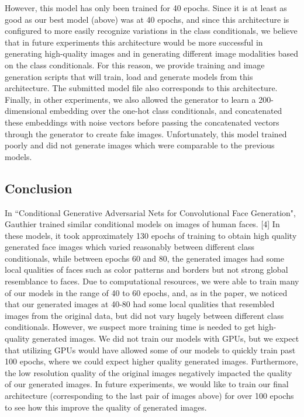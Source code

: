 \documentclass[a4paper]{article}
\begin{document}
However, this model has only been trained for 40 epochs. Since it is at least as good as our best model (above) was at 40 epochs, and since this architecture is configured to more easily recognize variations in the class conditionals, we believe that in future experiments this architecture would be more successful in generating high-quality images and in generating different image modalities based on the class conditionals. For this reason, we provide training and image generation scripts that will train, load and generate models from this architecture. The submitted model file also corresponds to this architecture. 
\newline
\newline
Finally, in other experiments, we also allowed the generator to learn a 200-dimensional embedding over the one-hot class conditionals, and concatenated these embeddings with noise vectors before passing the concatenated vectors through the generator to create fake images. Unfortunately, this model trained poorly and did not generate images which were comparable to the previous models. 
\subsection*{Conclusion}
In ``Conditional Generative Adversarial Nets for Convolutional Face Generation", Gauthier trained similar conditional models on images of human faces. [4] In these models, it took approximately 130 epochs of training to obtain high quality generated face images which varied reasonably between different class conditionals, while between epochs 60 and 80, the generated images had some local qualities of faces such as color patterns and borders but not strong global resemblance to faces. Due to computational resources, we were able to train many of our models in the range of 40 to 60 epochs, and, as in the paper, we noticed that our generated images at 40-80 had some local qualities that resembled images from the original data, but did not vary hugely between different class conditionals.
\newline
\newline
However, we suspect more training time is needed to get high-quality generated images. We did not train our models with GPUs, but we expect that utilizing GPUs would have allowed some of our models to quickly train past 100 epochs, where we could expect higher quality generated images. Furthermore, the low resolution quality of the original images negatively impacted the quality of our generated images. In future experiments, we would like to train our final architecture (corresponding to the last pair of images above) for over 100 epochs to see how this improve the quality of generated images.
\end{document}
